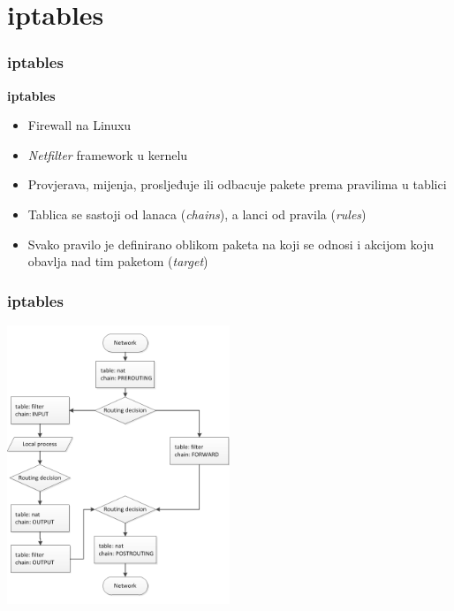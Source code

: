 \documentclass[t,table,usenames,dvipsnames]{beamer}
\begin{document}
\section{iptables}
\begin{frame}
	\frametitle{iptables}
	\textbf{iptables}
	\begin{itemize}
		\item Firewall na Linuxu
		\item \emph{Netfilter} framework u kernelu
	\end{itemize}
	
	\begin{itemize}
		\item Provjerava, mijenja, prosljeđuje ili odbacuje pakete prema pravilima u tablici
		\item Tablica se sastoji od lanaca (\emph{chains}), a lanci od pravila (\emph{rules})
		\item Svako pravilo je definirano oblikom paketa na koji se odnosi i akcijom koju obavlja nad tim paketom (\emph{target})
	\end{itemize}
\end{frame}

\begin{frame}
	\frametitle{iptables}
	\centering
	\vspace{-1em}
	\includegraphics[width=0.5\textwidth]{iptables.png}
\end{frame}
\end{document}

